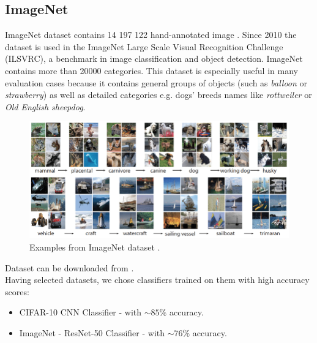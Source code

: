 \documentclass[12pt,a4paper,openany]{book}
\begin{document}
\subsection*{ImageNet} 
\noindent ImageNet dataset contains 14 197 122 hand-annotated image \cite{imagenet_data}. Since 2010 the dataset is used in the ImageNet Large Scale Visual Recognition Challenge (ILSVRC), a benchmark in image classification and object detection.  ImageNet contains more than 20000 categories. This dataset is especially useful in many evaluation cases because it contains general groups of objects (such as \textit{balloon} or \textit{strawberry}) as well as detailed categories e.g. dogs' breeds names like \textit{rottweiler} or \textit{Old English sheepdog}.
\begin{figure}[H]
    \centering
    \includegraphics[scale=0.5]{figs/imagenet.png}
    \caption{Examples from ImageNet dataset \cite{imagenet_example}.}
\end{figure}
\noindent Dataset can be downloaded from \cite{imagenet_data}. \\
\newline
\noindent Having selected datasets, we chose classifiers trained on them with high accuracy scores:\\
\begin{itemize}
\item CIFAR-10 CNN Classifier \cite{cifar10_classifier} - with $ \sim 85\% $ accuracy.
\item ImageNet - ResNet-50 Classifier \cite{resnet} -  with $ \sim 76\% $ accuracy. 
\end{itemize}
\end{document}
